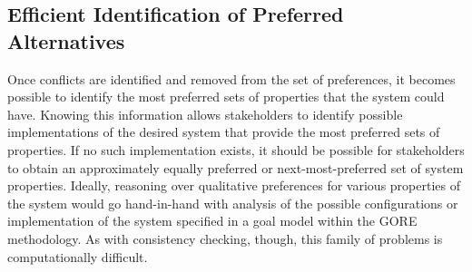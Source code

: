 %

\subsection{Efficient Identification of Preferred Alternatives}
\label{sec:pref-alt}

Once conflicts are identified and removed from the set of preferences, it becomes possible to identify the most preferred sets of properties that the system could have. Knowing this information allows stakeholders to identify possible implementations of the desired system that provide the most preferred sets of properties. If no such implementation exists, it should be possible for stakeholders to obtain an approximately equally preferred or next-most-preferred set of system properties. Ideally, reasoning over qualitative preferences for various properties of the system would go hand-in-hand with analysis of the possible configurations or implementation of the system specified in a goal model within the GORE methodology. As with consistency checking, though, this family of problems is computationally difficult.

